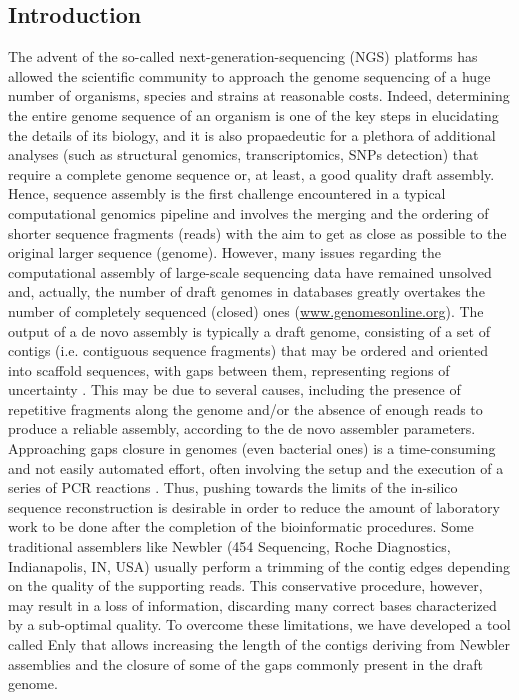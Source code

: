 \subsection{Introduction}
The advent of the so-called next-generation-sequencing (NGS) platforms has allowed the scientific community to approach the genome sequencing of a huge number of organisms, species and strains at reasonable costs. Indeed, determining the entire genome sequence of an organism is one of the key steps in elucidating the details of its biology, and it is also propaedeutic for a plethora of additional analyses (such as structural genomics, transcriptomics, SNPs detection) that require a complete genome sequence or, at least, a good quality draft assembly. Hence, sequence assembly is the first challenge encountered in a typical computational genomics pipeline and involves the merging and the ordering of shorter sequence fragments (reads) with the aim to get as close as possible to the original larger sequence (genome). However, many issues regarding the computational assembly of large-scale sequencing data have remained unsolved \cite{scheibye2009sequence} and, actually, the number of draft genomes in databases greatly overtakes the number of completely sequenced (closed) ones (\href{www.genomesonline.org}{www.genomesonline.org}). The output of a de novo assembly is typically a draft genome, consisting of a set of contigs (i.e. contiguous sequence fragments) that may be ordered and oriented into scaffold sequences, with gaps between them, representing regions of uncertainty \cite{earl2011assemblathon}. This may be due to several causes, including the presence of repetitive fragments along the genome and/or the absence of enough reads to produce a reliable assembly, according to the de novo assembler parameters. Approaching gaps closure in genomes (even bacterial ones) is a time-consuming and not easily automated effort, often involving the setup and the execution of a series of PCR reactions \cite{galardini2011contiguator}. Thus, pushing towards the limits of the in-silico sequence reconstruction is desirable in order to reduce the amount of laboratory work to be done after the completion of the bioinformatic procedures. Some traditional assemblers like Newbler (454 Sequencing, Roche Diagnostics, Indianapolis, IN, USA) usually perform a trimming of the contig edges depending on the quality of the supporting reads. This conservative procedure, however, may result in a loss of information, discarding many correct bases characterized by a sub-optimal quality. To overcome these limitations, we have developed a tool called Enly that allows increasing the length of the contigs deriving from Newbler assemblies and the closure of some of the gaps commonly present in the draft genome.

